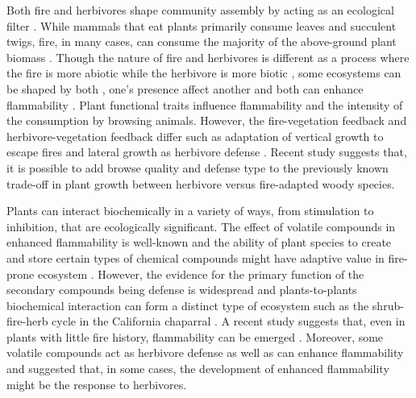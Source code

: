 \documentclass{ttuthes2007}
\begin{document}
Both fire and herbivores shape community assembly by acting as an ecological filter \citep{belsky1992effects, grazingecologicalfilters, morphospace, verdu2007ecologicalfilter,fireecologicalfitlers}. While mammals that eat plants primarily consume leaves and succulent twigs, fire, in many cases, can consume the majority of the above-ground plant biomass \citep{bond1996fire,globalherbivore}. Though the nature of fire and herbivores is different as a process where the fire is more abiotic while the herbivore is more biotic  \citep{globalherbivore,archibald2019unified}, some ecosystems can be shaped by both \citep{van2003effects,  archibald2005shaping,staver2009browsing,donaldson2018ecological, noy1995interactive}, one's presence affect another\citep{holdo2009grazers, foster2015synergistic} and both can enhance flammability \citep{white1994monoterpenes, owens1998seasonal, Ulex}. Plant functional traits influence flammability and the intensity of the consumption by browsing animals. However, the fire-vegetation feedback and herbivore-vegetation feedback differ such as adaptation of vertical growth to escape fires and lateral growth as herbivore defense \citep{archibald2003growing,staver2012top,moncrieff2011tree}. Recent study \citep{wigley2015mammal} suggests that, it is possible to add browse quality and defense type to the previously known trade-off in plant growth between herbivore versus fire-adapted woody species.

Plants can interact biochemically in a variety of ways, from stimulation to inhibition, that are ecologically significant\citep{muller1966role}. The effect of volatile compounds in enhanced flammability is well-known \citep{mutch1970wildland,white1994monoterpenes,owens1998seasonal,volatile1,volatile2,volatile3,alam2020shoot,ormeno2009relationship} and the ability of plant species to create and store certain types of chemical compounds might have adaptive value in fire-prone ecosystem \citep{pausas2016secondary}. However, the evidence for the primary function of the secondary compounds being defense is widespread \citep{primaryfunction} and plants-to-plants biochemical interaction can form a distinct type of ecosystem such as the shrub-fire-herb cycle in the California chaparral \citep{allelopathic}. A recent study suggests that, even in plants with little fire history, flammability can be emerged \citep{cui2020shoot}. Moreover, some volatile compounds act as herbivore defense as well as can enhance flammability \citep{white1994monoterpenes} and \citep{owens1998seasonal} suggested that, in some cases, the development of enhanced flammability might be the response to herbivores.
\end{document}
